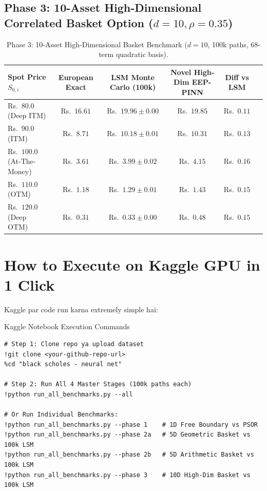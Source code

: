 \documentclass[11pt,a4paper,oneside]{book}
\begin{document}
\subsection{Phase 3: 10-Asset High-Dimensional Correlated Basket Option ($d=10, \rho=0.35$)}
\begin{table}[htbp]
\centering
\small
\caption{Phase 3: 10-Asset High-Dimensional Basket Benchmark ($d=10$, 100k paths, 68-term quadratic basis).}
\begin{tabularx}{\textwidth}{@{}l c c c c c@{}}
\toprule
\textbf{Spot Price $S_{0,i}$} & \textbf{European Exact} & \textbf{LSM Monte Carlo (100k)} & \textbf{Novel High-Dim EEP-PINN} & \textbf{Diff vs LSM} \\ \midrule
Rs.~$80.0$ (Deep ITM) & Rs.~$16.61$ & Rs.~$19.96 \pm 0.00$ & Rs.~$19.85$ & Rs.~$0.11$ \\
Rs.~$90.0$ (ITM) & Rs.~$8.71$ & Rs.~$10.18 \pm 0.01$ & Rs.~$10.31$ & Rs.~$0.13$ \\
Rs.~$100.0$ (At-The-Money) & Rs.~$3.61$ & Rs.~$3.99 \pm 0.02$ & Rs.~$4.15$ & Rs.~$0.16$ \\
Rs.~$110.0$ (OTM) & Rs.~$1.18$ & Rs.~$1.29 \pm 0.01$ & Rs.~$1.43$ & Rs.~$0.15$ \\
Rs.~$120.0$ (Deep OTM) & Rs.~$0.31$ & Rs.~$0.33 \pm 0.00$ & Rs.~$0.48$ & Rs.~$0.15$ \\ \bottomrule
\end{tabularx}
\end{table}

\section{How to Execute on Kaggle GPU in 1 Click}
Kaggle par code run karna extremely simple hai:

\begin{codebox}{Kaggle Notebook Execution Commands}
\begin{verbatim}
# Step 1: Clone repo ya upload dataset
!git clone <your-github-repo-url>
%cd "black scholes - neural net"

# Step 2: Run All 4 Master Stages (100k paths each)
!python run_all_benchmarks.py --all

# Or Run Individual Benchmarks:
!python run_all_benchmarks.py --phase 1    # 1D Free Boundary vs PSOR
!python run_all_benchmarks.py --phase 2a   # 5D Geometric Basket vs 100k LSM
!python run_all_benchmarks.py --phase 2b   # 5D Arithmetic Basket vs 100k LSM
!python run_all_benchmarks.py --phase 3    # 10D High-Dim Basket vs 100k LSM
\end{verbatim}
\end{codebox}
\end{document}
